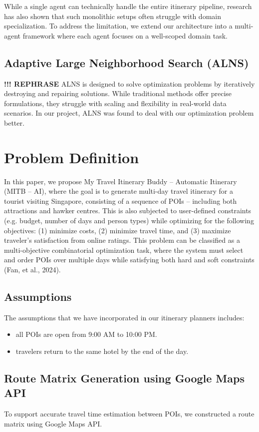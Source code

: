 \documentclass{ecai}
\begin{document}
While a single agent can technically handle the entire itinerary pipeline, research has also shown that such monolithic setups often struggle with domain specialization. To address the limitation, we extend our architecture into a multi-agent framework where each agent focuses on a well-scoped domain task.

\subsection{Adaptive Large Neighborhood Search (ALNS)}
\textbf{!!! REPHRASE} ALNS is designed to solve optimization problems by iteratively destroying and repairing solutions. While traditional methods offer precise formulations, they struggle with scaling and flexibility in real-world data scenarios. In our project, ALNS was found to deal with our optimization problem better.

\section{Problem Definition}
In this paper, we propose My Travel Itinerary Buddy – Automatic Itinerary (MITB – AI), where the goal is to generate multi-day travel itinerary for a tourist visiting Singapore, consisting of a sequence of POIs – including both attractions and hawker centres. This is also subjected to user-defined constraints (e.g. budget, number of days and person types) while optimizing for the following objectives: (1) minimize costs, (2) minimize travel time, and (3) maximize traveler’s satisfaction from online ratings. This problem can be classified as a multi-objective combinatorial optimization task, where the system must select and order POIs over multiple days while satisfying both hard and soft constraints (Fan, et al., 2024).

\subsection{Assumptions}
The assumptions that we have incorporated in our itinerary planners includes: 
\begin{itemize}
    \item all POIs are open from 9:00 AM to 10:00 PM.
    \item travelers return to the same hotel by the end of the day.
\end{itemize}

\subsection{Route Matrix Generation using Google Maps API}
To support accurate travel time estimation between POIs, we constructed a route matrix using Google Maps API.
\end{document}
